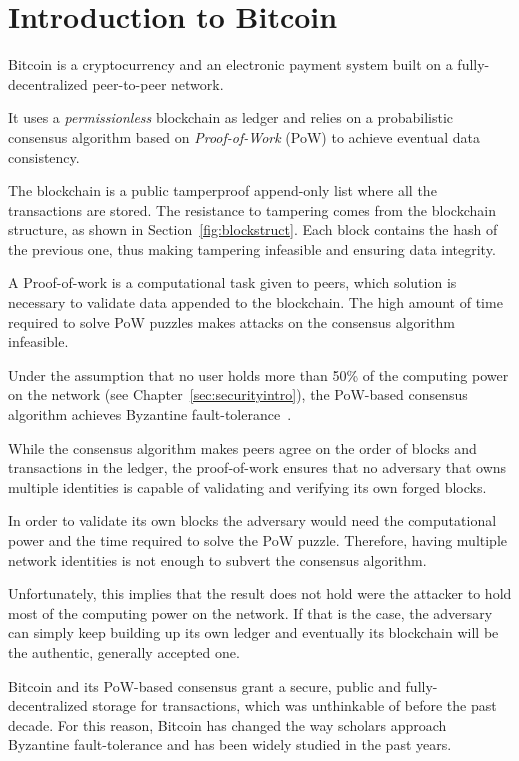 \chapter{Introduction to Bitcoin}
\label{sec:introbtc}

Bitcoin is a cryptocurrency and an electronic payment system built on a fully-decentralized peer-to-peer network.

It uses a \textit{permissionless} blockchain as ledger and relies on a probabilistic consensus algorithm based on \emph{Proof-of-Work} (PoW) to achieve eventual data consistency.

The blockchain is a public tamperproof append-only list where all the transactions are stored. The resistance to tampering comes from the blockchain structure, as shown in Section~\ref{fig:blockstruct}. Each block contains the hash of the previous one, thus making tampering infeasible and ensuring data integrity.

A Proof-of-work is a computational task given to peers, which solution is necessary to validate data appended to the blockchain. The high amount of time required to solve PoW puzzles makes attacks on the consensus algorithm infeasible.\par

Under the assumption that no user holds more than 50\% of the computing power on the network (see Chapter~\ref{sec:securityintro}), the PoW-based consensus algorithm achieves Byzantine fault-tolerance~\cite{nakamoto}.

While the consensus algorithm makes peers agree on the order of blocks and transactions in the ledger, the proof-of-work ensures that no adversary that owns multiple identities is capable of validating and verifying its own forged blocks.

In order to validate its own blocks the adversary would need the computational power and the time required to solve the PoW puzzle. Therefore, having multiple network identities is not enough to subvert the consensus algorithm. 

Unfortunately, this implies that the result does not hold were the attacker to hold most of the computing power on the network. If that is the case, the adversary can simply keep building up its own ledger and eventually its blockchain will be the authentic, generally accepted one.\par

Bitcoin and its PoW-based consensus grant a secure, public and fully-decentralized storage for transactions, which was unthinkable of before the past decade. For this reason, Bitcoin has changed the way scholars approach Byzantine fault-tolerance and has been widely studied in the past years. 

